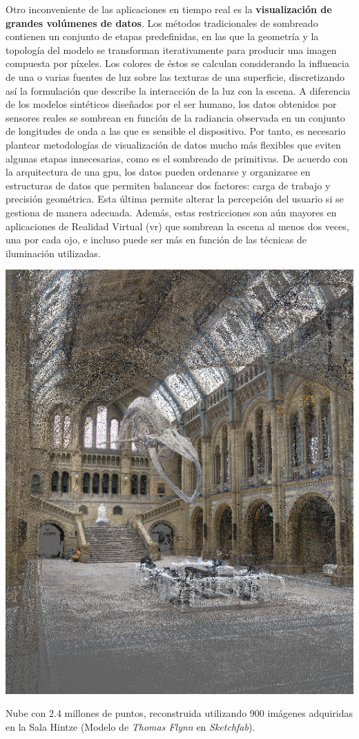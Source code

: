 Otro inconveniente de las aplicaciones en tiempo real es la \textbf{visualización de grandes volúmenes de datos}. Los métodos tradicionales de sombreado contienen un conjunto de etapas predefinidas, en las que la geometría y la topología del modelo se transforman iterativamente para producir una imagen compuesta por píxeles. Los colores de éstos se calculan considerando la influencia de una o varias fuentes de luz sobre las texturas de una superficie, discretizando así la formulación que describe la interacción de la luz con la escena. A diferencia de los modelos sintéticos diseñados por el ser humano, los datos obtenidos por sensores reales se sombrean en función de la radiancia observada en un conjunto de longitudes de onda a las que es sensible el dispositivo. Por tanto, es necesario plantear metodologías de visualización de datos mucho más flexibles que eviten algunas etapas innecesarias, como es el sombreado de primitivas. De acuerdo con la arquitectura de una \acrshort{gpu}, los datos pueden ordenarse y organizarse en estructuras de datos que permiten balancear dos factores: carga de trabajo y precisión geométrica. Esta última permite alterar la percepción del usuario si se gestiona de manera adecuada. Además, estas restricciones son aún mayores en aplicaciones de Realidad Virtual (\acrshort{vr}) que sombrean la escena al menos dos veces, una por cada ojo, e incluso puede ser más en función de las técnicas de iluminación utilizadas.
\begin{marginfigure}[-7.5cm]
	\includegraphics{figs/introduction/hintze.png}
	\caption{Nube con 2.4 millones de puntos, reconstruida utilizando 900 imágenes adquiridas en la Sala Hintze (Modelo de \textit{Thomas Flynn} en \textit{Sketchfab}).  }
	\label{fig:hintze_hall_spanish}
\end{marginfigure}

